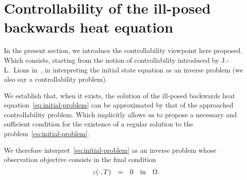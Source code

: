 \section{Controllability of the ill-posed backwards heat
equation}\label{sec:controllability}

In the present section, we introduce the controllability viewpoint here
proposed. Which consists, starting from the notion of controllability
introduced by J.-L.~Lions in~\cite[222]{lions1}, in interpreting the
initial state equation as an inverse problem (we also say a controllability
problem).

We establish that, when it exists, the solution of the ill-posed backwards
heat equation~\eqref{eq:initial-problem} can be approximated by that of the
approached controllability problem. Which implicitly allows us to propose a
necessary and sufficient condition for the existence of a regular solution
to the problem~\eqref{eq:initial-problem}.

We therefore interpret~\eqref{eq:initial-problem} as an inverse problem
whose observation objective consists in the final condition
\begin{equation*}
    \begin{array}{rclll}
        {z}\!\left({\cdot,T}\right) & = & 0 & \text{in} & \Omega.
    \end{array}
\end{equation*}

